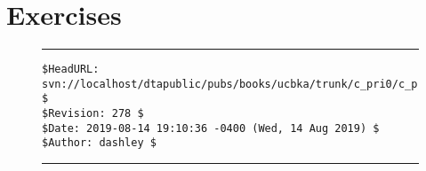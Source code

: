 \section{Exercises}



\noindent\begin{figure}[!b]
\noindent\rule[-0.25in]{\textwidth}{1pt}
\begin{tiny}
\begin{verbatim}
$HeadURL: svn://localhost/dtapublic/pubs/books/ucbka/trunk/c_pri0/c_pri0.tex $
$Revision: 278 $
$Date: 2019-08-14 19:10:36 -0400 (Wed, 14 Aug 2019) $
$Author: dashley $
\end{verbatim}
\end{tiny}
\noindent\rule[0.25in]{\textwidth}{1pt}
\end{figure}

%
